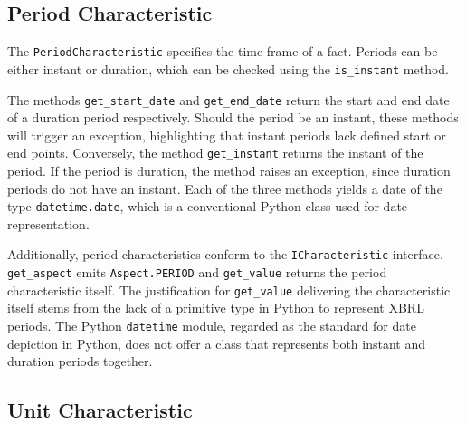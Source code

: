\subsection{Period Characteristic}

The \texttt{PeriodCharacteristic} specifies the time frame of a fact.
Periods can be either instant or duration, which can be checked using the \texttt{is\_instant} method.

The methods \texttt{get\_start\_date} and \texttt{get\_end\_date} return the start and end date of a duration period respectively.
Should the period be an instant, these methods will trigger an exception, highlighting that instant periods lack defined start or end points.
Conversely, the method \texttt{get\_instant} returns the instant of the period.
If the period is duration, the method raises an exception, since duration periods do not have an instant.
Each of the three methods yields a date of the type \texttt{datetime.date}, which is a conventional Python class used for date representation.

Additionally, period characteristics conform to the \texttt{ICharacteristic} interface. 
\texttt{get\_aspect} emits \texttt{Aspect.PERIOD} and \texttt{get\_value} returns the period characteristic itself. 
The justification for \texttt{get\_value} delivering the characteristic itself stems from the lack of a primitive type in Python to represent XBRL periods. 
The Python \texttt{datetime} module, regarded as the standard for date depiction in Python, 
does not offer a class that represents both instant and duration periods together.

\subsection{Unit Characteristic}

